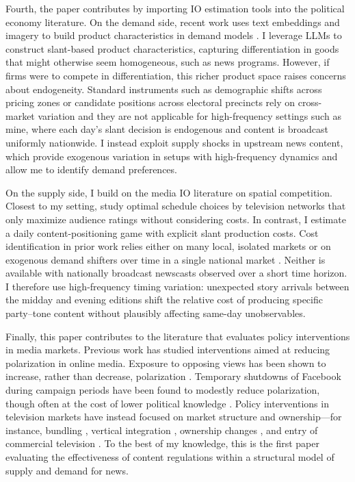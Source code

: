 \documentclass[12pt]{article}
\begin{document}
Fourth, the paper contributes by importing IO estimation tools into the political economy literature. On the demand side, recent work uses text embeddings and imagery to build product characteristics in demand models \citep{compiani2025demandestimationtextimage}. I leverage LLMs to construct slant-based product characteristics, capturing differentiation in goods that might otherwise seem homogeneous, such as news programs. However, if firms were to compete in differentiation, this richer product space raises concerns about endogeneity. Standard instruments such as demographic shifts across pricing zones \citep{fan} or candidate positions across electoral precincts \citep{longuet-marx2025party} rely on cross-market variation and they are not applicable for high-frequency settings such as mine,  where each day’s slant decision is endogenous and content is broadcast uniformly nationwide. I instead exploit supply shocks in upstream news content, which provide exogenous variation in setups with high-frequency dynamics and allow me to identify demand preferences. 

On the supply side, I build on the media IO literature on spatial competition. Closest to my setting, \citet{Goettler2001SpatialCI} study optimal schedule choices by television networks that only maximize audience ratings without considering costs. In contrast, I estimate a daily content-positioning game with explicit slant production costs. Cost identification in prior work relies either on many local, isolated markets \citep[e.g.,][]{Draganska2008BeyondPV,fan} or on exogenous demand shifters over time in a single national market \citep{Wollmann2018TrucksWB}. Neither is available with nationally broadcast  newscasts observed over a short time horizon. I therefore use high-frequency timing variation: unexpected story arrivals between the midday and evening editions shift the relative cost of producing specific party–tone content without plausibly affecting same-day unobservables. 


Finally, this paper contributes to the literature that evaluates policy interventions in media markets. Previous work has studied interventions aimed at reducing polarization in online media. Exposure to opposing views has been shown to increase, rather than decrease, polarization \citep{bail2018exposure}. Temporary shutdowns of Facebook during 
campaign periods have been found to modestly reduce polarization, though often at the cost of lower political knowledge \citep{Allcott2024TheEO}. Policy interventions in television markets have instead focused on market structure and ownership—for instance, bundling \citep{crawford_yurukoglu}, vertical integration \citep{crawford_vertical}, ownership changes \citep{MARTIN_McCRAIN_2019}, and entry of commercial television \citep{prat_stromberg_entry}. To the best of my knowledge, this is the first paper evaluating the effectiveness of content regulations within a structural model of supply and demand for news.
\end{document}
